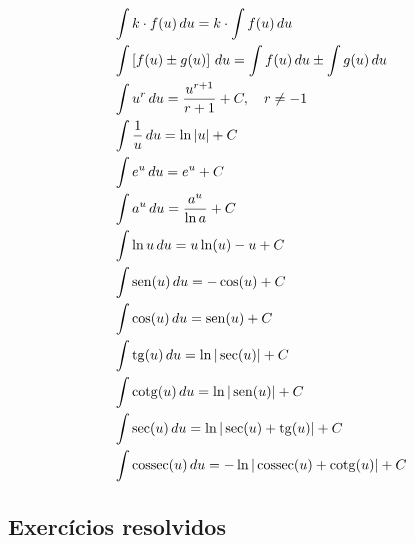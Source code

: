 \begin{small}
\begin{align}
  & \int k\cdot f(u)\,du = k\cdot\int f(u)\,du\\
  & \int \left[f(u)\pm g(u)\right]\,du = \int f(u)\,du \pm \int g(u)\,du\\
  & \int u^r\,du = \frac{u^{r+1}}{r+1} + C,\quad r\neq -1\\
  & \int \frac{1}{u}\,du = \ln |u| + C \\
  & \int e^u\,du = e^u + C \\
  & \int a^u\,du = \frac{a^u}{\ln a} + C \\
  & \int \ln u \,du = u\ln(u) - u + C \\
  & \int \operatorname{sen}(u)\,du = -\cos(u) + C \\
  & \int \cos(u)\,du = \operatorname{sen}(u) + C \\
  & \int \operatorname{tg}(u)\,du = \ln|\sec(u)| + C \\
  & \int \operatorname{cotg}(u)\,du = \ln|\operatorname{sen}(u)| + C \\
  & \int \sec(u)\,du = \ln|\sec(u)+\operatorname{tg}(u)| + C \\
  & \int \operatorname{cossec}(u)\,du = -\ln|\operatorname{cossec}(u)+\operatorname{cotg}(u)| + C
\end{align}
\end{small}

\subsection{Exercícios resolvidos}


